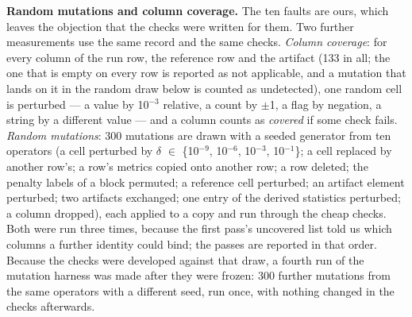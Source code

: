 \documentclass[acmsmall,screen,review]{acmart}
\begin{document}
\textbf{Random mutations and column coverage.} The ten faults are ours, which leaves the objection that the checks were written for them. Two further measurements use the same record and the same checks. \textit{Column coverage}: for every column of the run row, the reference row and the artifact (133 in all; the one that is empty on every row is reported as not applicable, and a mutation that lands on it in the random draw below is counted as undetected), one random cell is perturbed --- a value by 10$^{-3}$ relative, a count by $\pm$1, a flag by negation, a string by a different value --- and a column counts as \textit{covered} if some check fails. \textit{Random mutations}: 300 mutations are drawn with a seeded generator from ten operators (a cell perturbed by $\delta$ $\in$ \{10$^{-9}$, 10$^{-6}$, 10$^{-3}$, 10$^{-1}$\}; a cell replaced by another row's; a row's metrics copied onto another row; a row deleted; the penalty labels of a block permuted; a reference cell perturbed; an artifact element perturbed; two artifacts exchanged; one entry of the derived statistics perturbed; a column dropped), each applied to a copy and run through the cheap checks. Both were run three times, because the first pass's uncovered list told us which columns a further identity could bind; the passes are reported in that order. Because the checks were developed against that draw, a fourth run of the mutation harness was made after they were frozen: 300 further mutations from the same operators with a different seed, run once, with nothing changed in the checks afterwards.
\end{document}

